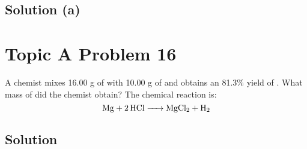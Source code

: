 \documentclass[10pt]{article}
\begin{document}
        \subsection{Solution (a)}
        

    \pagebreak
    \section{Topic A Problem 16}
        A chemist mixes 16.00 g of  with 10.00 g of  and obtains an 81.3\% yield of .
        What mass of  did the chemist obtain? 
        The chemical reaction is:
        \begin{equation}
            \ce{Mg + 2 HCl -> MgCl2 + H2}
        \end{equation}

        \subsection{Solution}



\end{document}
